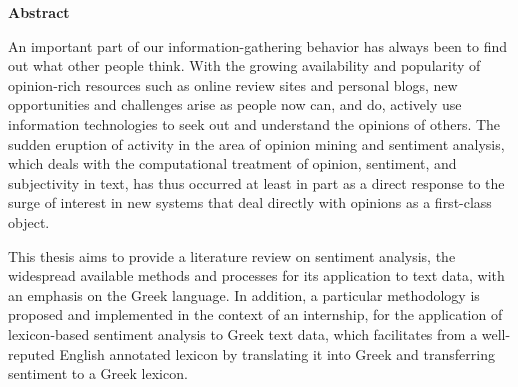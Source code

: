 \begin{center}
\textbf{\large Abstract}
\end{center}

An important part of our information-gathering behavior has always been
to find out what other people think.
With the growing availability and popularity of opinion-rich resources
such as online review sites and personal blogs,
new opportunities and challenges arise
as people now can, and do, actively use information technologies
to seek out and understand the opinions of others.
The sudden eruption of activity
in the area of opinion mining and sentiment analysis,
which deals with the computational treatment of opinion,
sentiment, and subjectivity in text,
has thus occurred at least in part
as a direct response to the surge of interest in new systems
that deal directly with opinions as a first-class object.

This thesis aims to provide a literature review on sentiment analysis,
the widespread available methods and processes
for its application to text data,
with an emphasis on the Greek language.
In addition, a particular methodology is proposed and implemented
in the context of an internship,
for the application of lexicon-based sentiment analysis to Greek text data,
which facilitates from a well-reputed English annotated lexicon
by translating it into Greek and transferring sentiment to a Greek lexicon.

